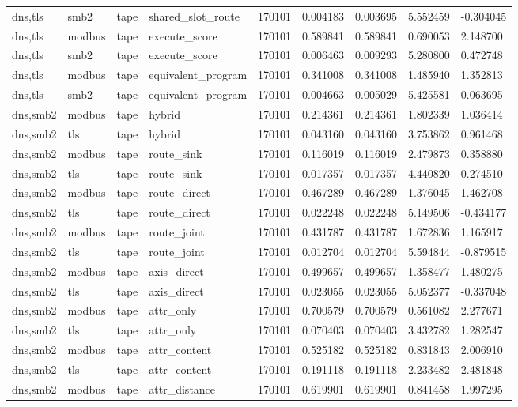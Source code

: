 \begin{tabular}{lllllllll}
dns,tls & smb2 & tape & shared\_slot\_route & 170101 & 0.004183 & 0.003695 & 5.552459 & -0.304045 \\
dns,tls & modbus & tape & execute\_score & 170101 & 0.589841 & 0.589841 & 0.690053 & 2.148700 \\
dns,tls & smb2 & tape & execute\_score & 170101 & 0.006463 & 0.009293 & 5.280800 & 0.472748 \\
dns,tls & modbus & tape & equivalent\_program & 170101 & 0.341008 & 0.341008 & 1.485940 & 1.352813 \\
dns,tls & smb2 & tape & equivalent\_program & 170101 & 0.004663 & 0.005029 & 5.425581 & 0.063695 \\
dns,smb2 & modbus & tape & hybrid & 170101 & 0.214361 & 0.214361 & 1.802339 & 1.036414 \\
dns,smb2 & tls & tape & hybrid & 170101 & 0.043160 & 0.043160 & 3.753862 & 0.961468 \\
dns,smb2 & modbus & tape & route\_sink & 170101 & 0.116019 & 0.116019 & 2.479873 & 0.358880 \\
dns,smb2 & tls & tape & route\_sink & 170101 & 0.017357 & 0.017357 & 4.440820 & 0.274510 \\
dns,smb2 & modbus & tape & route\_direct & 170101 & 0.467289 & 0.467289 & 1.376045 & 1.462708 \\
dns,smb2 & tls & tape & route\_direct & 170101 & 0.022248 & 0.022248 & 5.149506 & -0.434177 \\
dns,smb2 & modbus & tape & route\_joint & 170101 & 0.431787 & 0.431787 & 1.672836 & 1.165917 \\
dns,smb2 & tls & tape & route\_joint & 170101 & 0.012704 & 0.012704 & 5.594844 & -0.879515 \\
dns,smb2 & modbus & tape & axis\_direct & 170101 & 0.499657 & 0.499657 & 1.358477 & 1.480275 \\
dns,smb2 & tls & tape & axis\_direct & 170101 & 0.023055 & 0.023055 & 5.052377 & -0.337048 \\
dns,smb2 & modbus & tape & attr\_only & 170101 & 0.700579 & 0.700579 & 0.561082 & 2.277671 \\
dns,smb2 & tls & tape & attr\_only & 170101 & 0.070403 & 0.070403 & 3.432782 & 1.282547 \\
dns,smb2 & modbus & tape & attr\_content & 170101 & 0.525182 & 0.525182 & 0.831843 & 2.006910 \\
dns,smb2 & tls & tape & attr\_content & 170101 & 0.191118 & 0.191118 & 2.233482 & 2.481848 \\
dns,smb2 & modbus & tape & attr\_distance & 170101 & 0.619901 & 0.619901 & 0.841458 & 1.997295 \\

\end{tabular}
